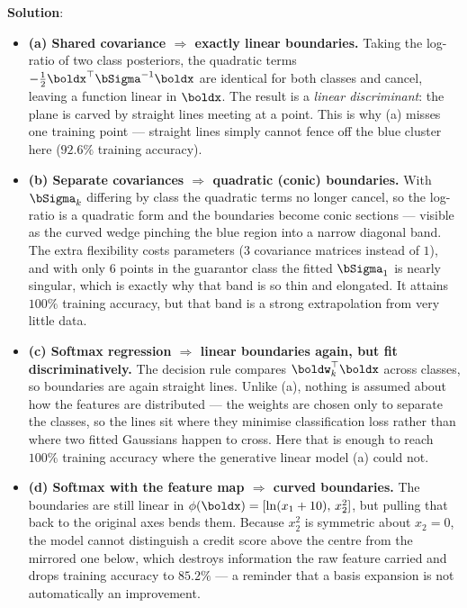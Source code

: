 \documentclass[submit]{../harvardml}
\newenvironment{solution}{
    \vspace{2mm}
    \color{blue}\noindent\textbf{Solution}:
}{}
\begin{document}
\begin{solution}
\begin{enumerate}
\begin{itemize}
  \item \textbf{(a) Shared covariance $\Rightarrow$ exactly linear boundaries.} Taking the
    log-ratio of two class posteriors, the quadratic terms
    $-\tfrac12\boldx^\top\bSigma^{-1}\boldx$ are identical for both classes and cancel,
    leaving a function linear in $\boldx$. The result is a \emph{linear discriminant}:
    the plane is carved by straight lines meeting at a point. This is why (a) misses
    one training point --- straight lines simply cannot fence off the blue cluster here
    ($92.6\%$ training accuracy).

  \item \textbf{(b) Separate covariances $\Rightarrow$ quadratic (conic) boundaries.} With
    $\bSigma_k$ differing by class the quadratic terms no longer cancel, so the
    log-ratio is a quadratic form and the boundaries become conic sections --- visible
    as the curved wedge pinching the blue region into a narrow diagonal band. The extra
    flexibility costs parameters ($3$ covariance matrices instead of $1$), and with
    only $6$ points in the guarantor class the fitted $\bSigma_1$ is nearly singular,
    which is exactly why that band is so thin and elongated. It attains $100\%$
    training accuracy, but that band is a strong extrapolation from very little data.

  \item \textbf{(c) Softmax regression $\Rightarrow$ linear boundaries again, but fit
    discriminatively.} The decision rule compares $\boldw_k^\top\boldx$ across classes,
    so boundaries are again straight lines. Unlike (a), nothing is assumed about how
    the features are distributed --- the weights are chosen only to separate the
    classes, so the lines sit where they minimise classification loss rather than where
    two fitted Gaussians happen to cross. Here that is enough to reach $100\%$
    training accuracy where the generative linear model (a) could not.

  \item \textbf{(d) Softmax with the feature map $\Rightarrow$ curved boundaries.} The
    boundaries are still linear in $\phi(\boldx) = [\ln(x_1+10),\, x_2^2]$, but pulling
    that back to the original axes bends them. Because $x_2^2$ is symmetric about
    $x_2 = 0$, the model cannot distinguish a credit score above the centre from the
    mirrored one below, which destroys information the raw feature carried and drops
    training accuracy to $85.2\%$ --- a reminder that a basis expansion is not
    automatically an improvement.


\end{itemize}
\end{enumerate}
\end{solution}
\end{document}
